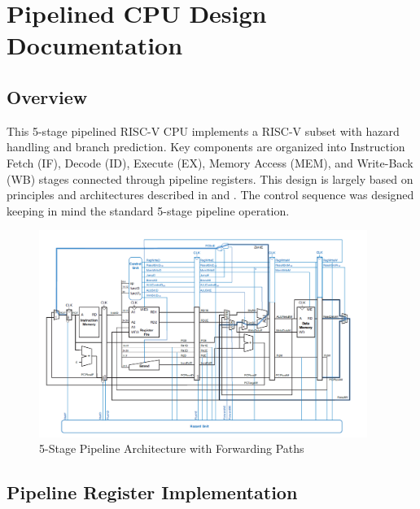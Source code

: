 \documentclass{article}
\numberwithin{figure}{section}
\numberwithin{table}{section}
\begin{document}
\section{Pipelined CPU Design Documentation}
\subsection{Overview}
This 5-stage pipelined RISC-V CPU implements a RISC-V subset with hazard handling and branch prediction. Key components are organized into Instruction Fetch (IF), Decode (ID), Execute (EX), Memory Access (MEM), and Write-Back (WB) stages connected through pipeline registers. This design is largely based on principles and architectures described in \citet{ref:harris} and \citet{Patterson:2020}. The control sequence was designed keeping in mind the standard 5-stage pipeline operation.
\begin{figure}[H]
    \centering
    \includegraphics[width=0.95\textwidth]{pipeline_design.png}
    \caption{5-Stage Pipeline Architecture with Forwarding Paths}
    \label{fig:pipeline}
\end{figure}

\subsection{Pipeline Register Implementation}
\end{document}
